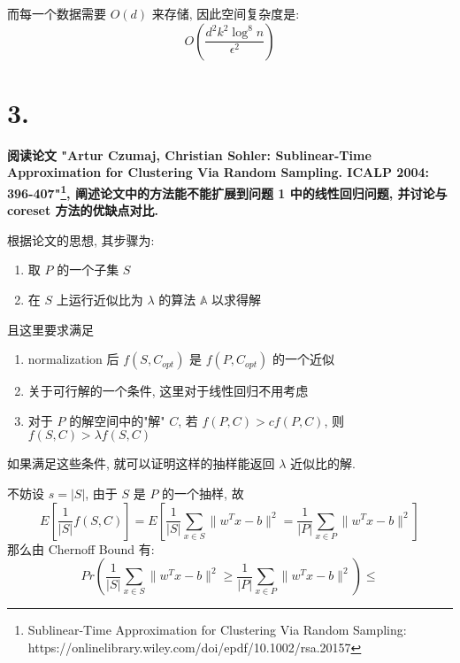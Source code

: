 \documentclass[UTF8]{article}
\begin{document}
而每一个数据需要 $O(d)$ 来存储, 因此空间复杂度是:
$$O\left( \frac{d^2k^2 \log ^8 n}{\epsilon^2} \right)$$

\newpage
\section*{3.}
\textbf{阅读论文 "Artur Czumaj, Christian Sohler: Sublinear-Time Approximation for Clustering Via Random Sampling. ICALP 2004: 396-407"\footnote{Sublinear-Time Approximation for Clustering Via Random Sampling: https://onlinelibrary.wiley.com/doi/epdf/10.1002/rsa.20157}, 阐述论文中的方法能不能扩展到问题 1 中的线性回归问题, 并讨论与 coreset 方法的优缺点对比.}

\noindent 根据论文的思想, 其步骤为:
\begin{enumerate}
	\item 取 $P$ 的一个子集 $S$
	\item 在 $S$ 上运行近似比为 $\lambda$ 的算法 $\mathbb{A}$ 以求得解
\end{enumerate}
且这里要求满足
\begin{enumerate}
	\item normalization 后 $f(S, C_{opt})$ 是 $f(P, C_{opt})$ 的一个近似
	\item 关于可行解的一个条件, 这里对于线性回归不用考虑
	\item 对于 $P$ 的解空间中的"解" $C$, 若 $f(P, C) > cf(P, C)$, 则 $f(S, C) > \lambda f(S, C)$
\end{enumerate}
如果满足这些条件, 就可以证明这样的抽样能返回 $\lambda$ 近似比的解.

\noindent 不妨设 $s=|S|$, 由于 $S$ 是 $P$ 的一个抽样, 故
$$E\left[\frac{1}{|S|}f(S,C)\right]=E\left[ \frac{1}{|S|}\sum\limits_{x\in S}\|w^Tx - b\|^2=\frac{1}{|P|}\sum\limits_{x\in P}\|w^Tx - b\|^2 \right]$$
那么由 Chernoff Bound 有:
$$Pr\left(\frac{1}{|S|}\sum\limits_{x\in S}\|w^Tx - b\|^2 \ge \frac{1}{|P|}\sum\limits_{x\in P}\|w^Tx - b\|^2 \right) \le$$
\end{document}
